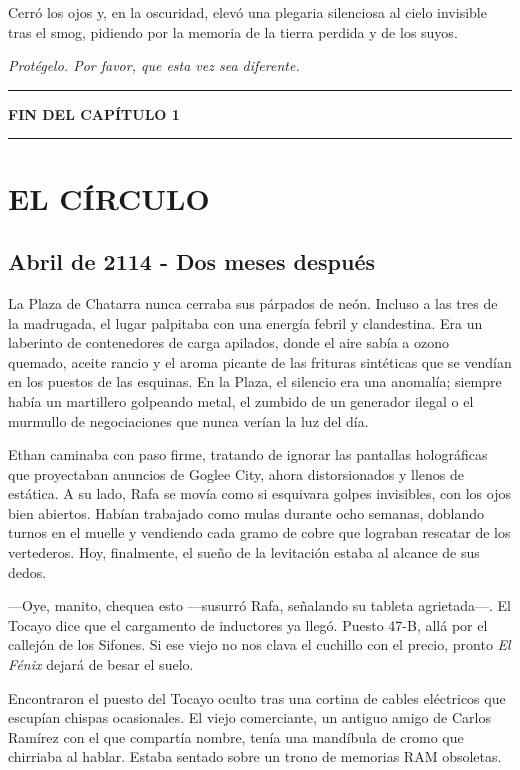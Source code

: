 \documentclass[12pt,a4paper]{book}
\begin{document}
Cerró los ojos y, en la oscuridad, elevó una plegaria silenciosa al cielo invisible tras el smog, pidiendo por la memoria de la tierra perdida y de los suyos.

\textit{Protégelo. Por favor, que esta vez sea diferente.}

\bigskip
\noindent\rule{\textwidth}{0.4pt}
\bigskip

\textbf{FIN DEL CAPÍTULO 1}


\bigskip
\noindent\rule{\textwidth}{0.4pt}
\bigskip

\chapter{EL CÍRCULO}

\section*{Abril de 2114 - Dos meses después}

La Plaza de Chatarra nunca cerraba sus párpados de neón. Incluso a las tres de la madrugada, el lugar palpitaba con una energía febril y clandestina. Era un laberinto de contenedores de carga apilados, donde el aire sabía a ozono quemado, aceite rancio y el aroma picante de las frituras sintéticas que se vendían en los puestos de las esquinas. En la Plaza, el silencio era una anomalía; siempre había un martillero golpeando metal, el zumbido de un generador ilegal o el murmullo de negociaciones que nunca verían la luz del día.

Ethan caminaba con paso firme, tratando de ignorar las pantallas holográficas que proyectaban anuncios de Goglee City, ahora distorsionados y llenos de estática. A su lado, Rafa se movía como si esquivara golpes invisibles, con los ojos bien abiertos. Habían trabajado como mulas durante ocho semanas, doblando turnos en el muelle y vendiendo cada gramo de cobre que lograban rescatar de los vertederos. Hoy, finalmente, el sueño de la levitación estaba al alcance de sus dedos.

---Oye, manito, chequea esto ---susurró Rafa, señalando su tableta agrietada---. El Tocayo dice que el cargamento de inductores ya llegó. Puesto 47-B, allá por el callejón de los Sifones. Si ese viejo no nos clava el cuchillo con el precio, pronto \textit{El Fénix} dejará de besar el suelo.

Encontraron el puesto del Tocayo oculto tras una cortina de cables eléctricos que escupían chispas ocasionales. El viejo comerciante, un antiguo amigo de Carlos Ramírez con el que compartía nombre, tenía una mandíbula de cromo que chirriaba al hablar. Estaba sentado sobre un trono de memorias RAM obsoletas.
\end{document}
